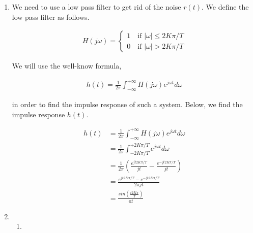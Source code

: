 \documentclass[10pt,a4paper, margin=1in]{article}
\begin{document}
\begin{enumerate}
\item
We need to use a low pass filter to get rid of the noise $r(t)$. We define the low pass filter as follows.
    	
	 \begin{equation}
    \begin{split}
    	H(j\omega) = \begin{cases}
				1 \quad \text{if } |\omega | \leq 2K\pi/T\\
				0 \quad \text{if } |\omega | > 2K\pi/T
				\end{cases}
    \end{split}
    \end{equation}
    
We will use the well-know formula,
    	
	 \begin{equation}
    \begin{split}
    	h(t) = \frac{1}{2\pi}\int_{-\infty}^{+\infty}H(j\omega)e^{j\omega t}d\omega
    \end{split}
    \end{equation}

in order to find the impulse response of such a system. Below, we find the impulse response $h(t)$.
    	
	 \begin{equation}
    \begin{split}
    	h(t) & = \frac{1}{2\pi}\int_{-\infty}^{+\infty}H(j\omega)e^{j\omega t}d\omega\\
	& = \frac{1}{2\pi}\int_{-2K\pi/T}^{+2K\pi/T}e^{j\omega t}d\omega\\
	& = \frac{1}{2\pi}\left( \frac{e^{jt2K\pi/T}}{jt} - \frac{e^{-jt2K\pi/T}}{jt} \right)\\
	& = \frac{e^{jt2K\pi/T} - e^{-jt2K\pi/T}}{2\pi jt} \\
	& = \frac{sin\left( \frac{t2K\pi}{T}\right)}{\pi t}
    \end{split}
    \end{equation}
\item 
    \begin{enumerate}
    \item


\end{enumerate}
\end{enumerate}
\end{document}

